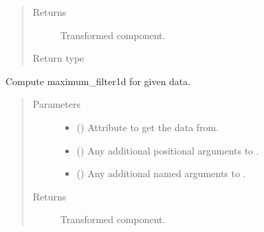 \documentclass[letterpaper,10pt,english]{sphinxmanual}
\begin{document}
\begin{fulllineitems}
\begin{fulllineitems}
\begin{quote}
\begin{description}
\begin{itemize}
\end{itemize}

\item[{Returns}] \leavevmode
{} \textendash{} Transformed component.

\item[{Return type}] \leavevmode
{\hyperref[\detokenize{api/base_classes:geology.src.base_spatial.SpatialComponent}]{}}

\end{description}\end{quote}

\end{fulllineitems}


\begin{fulllineitems}
\label{\detokenize{api/states:geology.src.States.maximum_filter1d}}
Compute maximum\_filter1d for given data.
\begin{quote}\begin{description}
\item[{Parameters}] \leavevmode\begin{itemize}
\item {} 
 (\sphinxstyleliteralemphasis{\sphinxupquote{, }}) \textendash{} Attribute to get the data from.

\item {} 
 () \textendash{} Any additional positional arguments to .

\item {} 
 () \textendash{} Any additional named arguments to .

\end{itemize}

\item[{Returns}] \leavevmode
{} \textendash{} Transformed component.


\end{description}
\end{quote}
\end{fulllineitems}
\end{fulllineitems}
\end{document}
